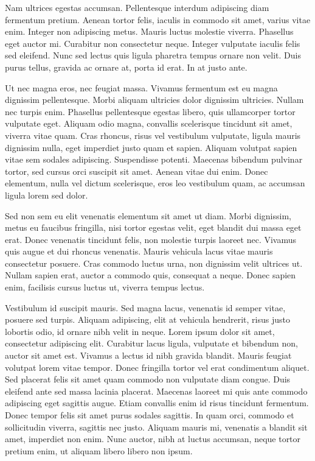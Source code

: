 \documentclass[a4paper]{article}
\begin{document}
Nam ultrices egestas accumsan. Pellentesque interdum adipiscing diam fermentum pretium. Aenean tortor felis, iaculis in commodo sit amet, varius vitae enim. Integer non adipiscing metus. Mauris luctus molestie viverra. Phasellus eget auctor mi. Curabitur non consectetur neque. Integer vulputate iaculis felis sed eleifend. Nunc sed lectus quis ligula pharetra tempus ornare non velit. Duis purus tellus, gravida ac ornare at, porta id erat. In at justo ante.

Ut nec magna eros, nec feugiat massa. Vivamus fermentum est eu magna dignissim pellentesque. Morbi aliquam ultricies dolor dignissim ultricies. Nullam nec turpis enim. Phasellus pellentesque egestas libero, quis ullamcorper tortor vulputate eget. Aliquam odio magna, convallis scelerisque tincidunt sit amet, viverra vitae quam. Cras rhoncus, risus vel vestibulum vulputate, ligula mauris dignissim nulla, eget imperdiet justo quam et sapien. Aliquam volutpat sapien vitae sem sodales adipiscing. Suspendisse potenti. Maecenas bibendum pulvinar tortor, sed cursus orci suscipit sit amet. Aenean vitae dui enim. Donec elementum, nulla vel dictum scelerisque, eros leo vestibulum quam, ac accumsan ligula lorem sed dolor.

Sed non sem eu elit venenatis elementum sit amet ut diam. Morbi dignissim, metus eu faucibus fringilla, nisi tortor egestas velit, eget blandit dui massa eget erat. Donec venenatis tincidunt felis, non molestie turpis laoreet nec. Vivamus quis augue et dui rhoncus venenatis. Mauris vehicula lacus vitae mauris consectetur posuere. Cras commodo luctus urna, non dignissim velit ultrices ut. Nullam sapien erat, auctor a commodo quis, consequat a neque. Donec sapien enim, facilisis cursus luctus ut, viverra tempus lectus.

Vestibulum id suscipit mauris. Sed magna lacus, venenatis id semper vitae, posuere sed turpis. Aliquam adipiscing, elit at vehicula hendrerit, risus justo lobortis odio, id ornare nibh velit in neque. Lorem ipsum dolor sit amet, consectetur adipiscing elit. Curabitur lacus ligula, vulputate et bibendum non, auctor sit amet est. Vivamus a lectus id nibh gravida blandit. Mauris feugiat volutpat lorem vitae tempor. Donec fringilla tortor vel erat condimentum aliquet. Sed placerat felis sit amet quam commodo non vulputate diam congue. Duis eleifend ante sed massa lacinia placerat. Maecenas laoreet mi quis ante commodo adipiscing eget sagittis augue. Etiam convallis enim id risus tincidunt fermentum. Donec tempor felis sit amet purus sodales sagittis. In quam orci, commodo et sollicitudin viverra, sagittis nec justo. Aliquam mauris mi, venenatis a blandit sit amet, imperdiet non enim. Nunc auctor, nibh at luctus accumsan, neque tortor pretium enim, ut aliquam libero libero non ipsum.
\end{document}
